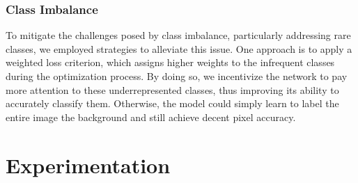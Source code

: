 \subsubsection*{Class Imbalance}
To mitigate the challenges posed by class imbalance, particularly addressing rare classes, we employed strategies to alleviate this issue. One approach is to apply a weighted loss criterion, which assigns higher weights to the infrequent classes during the optimization process. By doing so, we incentivize the network to pay more attention to these underrepresented classes, thus improving its ability to accurately classify them. Otherwise, the model could simply learn to label the entire image the background and still achieve decent pixel accuracy. 

\section*{Experimentation}


